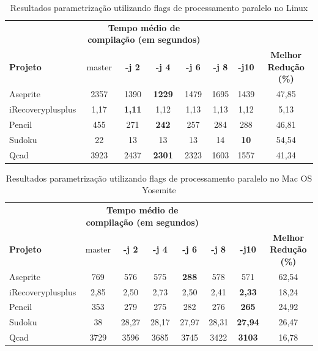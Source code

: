 \begin{table}[!ht]
\tiny
\centering
\caption{Resultados parametrização utilizando flags de processamento paralelo no Linux}
\label{tab:flags_processamento_paralelo:linux}
\begin{tabular}{lccccccc}
& \multicolumn{4}{c}{\textbf{Tempo médio de compilação (em segundos)} } \\
\textbf{Projeto} & master & \textbf{-j 2} & \textbf{-j 4} & \textbf{-j 6} & \textbf{-j 8} & \textbf{-j10} &  \textbf{Melhor Redução (\%)} \\ \toprule
Aseprite & 2357 & 1390 & \textbf{1229} & 1479 & 1695 & 1439 & 47,85  \\ 
iRecoveryplusplus & 1,17 & \textbf{1,11} &  1,12 & 1,13 & 1,13 & 1,12 & 5,13 \\ 
Pencil & 455 & 271 & \textbf{242} & 257 & 284 & 288 &  46,81 \\ 
Sudoku & 22 & 13 & 13 & 13 & 14 & \textbf{10} & 54,54  \\ 
Qcad & 3923 & 2437 & \textbf{2301} & 2323 & 1603 & 1557 & 41,34 \\ 
\end{tabular}
\end{table}


\begin{table}[!ht]
\tiny
\centering
\caption{Resultados parametrização utilizando flags de processamento paralelo no Mac OS Yosemite}
\label{tab:flags_processamento_paralelo:mac_os}
\begin{tabular}{lccccccc}
& \multicolumn{4}{c}{\textbf{Tempo médio de compilação (em segundos)} } \\
\textbf{Projeto} &  master & \textbf{-j 2} & \textbf{-j 4} & \textbf{-j 6} & \textbf{-j 8} & \textbf{-j10} &  \textbf{Melhor Redução (\%)} \\ \toprule
Aseprite  & 769 & 576 & 575 & \textbf{288} & 578 & 571 &  62,54 \\ 
iRecoveryplusplus & 2,85 & 2,50 & 2,73 &  2,50 &  2,41 &  \textbf{2,33} & 18,24\\ 
Pencil & 353  & 279 & 275 & 282 & 276 & \textbf{265} & 24,92 \\ 
Sudoku &  38   & 28,27 & 28,17 & 27,97 & 28,31 & \textbf{27,94} & 26,47 \\ 
Qcad   & 3729  & 3596 & 3685 & 3745 & 3422 & \textbf{3103}  & 16,78 \\ 
\end{tabular}
\end{table}

